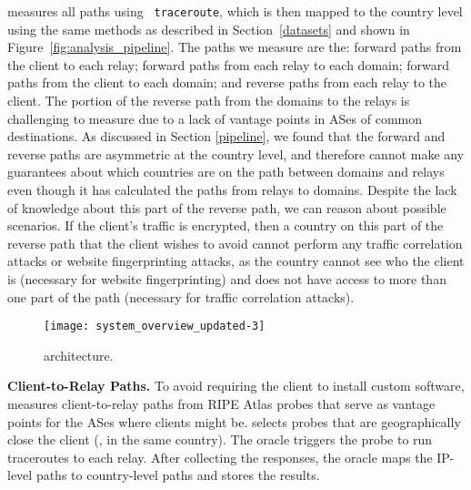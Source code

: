 \system{} measures all paths using {\tt 
traceroute}, which is then mapped to the country level using the same methods as 
described in Section~\ref{datasets} and shown in Figure~\ref{fig:analysis_pipeline}.
The paths we measure are the: forward paths from 
the client to each relay; forward paths from each relay to each domain; forward
paths from the client to each domain; and reverse paths from each relay to the 
client. 
The portion of the reverse path from the domains to the relays is
challenging to measure due to a lack of vantage points in ASes of common
destinations. As discussed in Section \ref{pipeline}, we found that  the
forward and reverse paths are asymmetric at the country level, and therefore
\system{} cannot make any guarantees about which countries are on the path
between  domains and relays even though it has calculated the paths from
relays to domains.   Despite the lack of knowledge about this part of the
reverse path,  we can reason about possible scenarios.  If the client's
traffic is encrypted, then a country on this part of
the reverse path that the client wishes to avoid cannot perform any  traffic correlation
attacks or website
fingerprinting attacks, as the country cannot see who the client is (necessary
for website fingerprinting) and does not have access to more than one part of
the path (necessary for traffic correlation attacks).

\begin{figure}[t!]
    \centering
        \texttt{[image: system\_overview\_updated-3]}
        \caption{\system{} architecture.}
        \label{fig:arch}
\end{figure}


{\bf Client-to-Relay Paths.} 
To avoid requiring the client to install custom software, \system{}
measures client-to-relay paths from RIPE Atlas probes that serve as 
vantage points for the ASes where \system{} clients might be.  \system{} selects
probes that
are geographically close the client (\eg, in the same 
country). The oracle triggers the probe to run traceroutes
to each relay.  After collecting the responses, the oracle maps 
the IP-level paths to country-level paths and stores the results.

